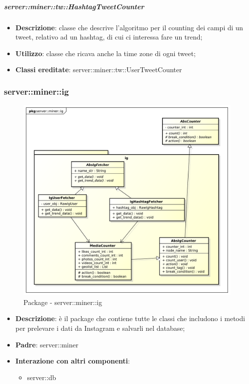 	\subparagraph{server::miner::tw::HashtagTweetCounter} %
		\label{subp:server_miner_tw_HashtagTweetCounter}
			\begin{itemize}
				\item \textbf{Descrizione}: classe che descrive l'algoritmo per il counting dei campi di un tweet, relativo ad un hashtag, di cui ci interessa fare un trend;
				\item \textbf{Utilizzo}: classe che ricava anche la time zone di ogni tweet;
				\item \textbf{Classi ereditate}: server::miner::tw::UserTweetCounter
			\end{itemize}

\subsubsection{server::miner::ig} %
\label{ssub:bdsm_app_server_miner_ig}
\begin{figure}[htbp]
	\centering
	\centerline{\includegraphics[scale=0.5]{./images/server/miner_ig.pdf}}
	\caption{Package - server::miner::ig}
\end{figure}


\begin{itemize}
  \item \textbf{Descrizione}: è il package che contiene tutte le classi che includono i metodi per prelevare i dati da Instagram e salvarli nel database;
  \item \textbf{Padre}: server::miner
   \item \textbf{Interazione con altri componenti}:
  	\begin{itemize}
  		\item server::db
  	\end{itemize}
\end{itemize}

